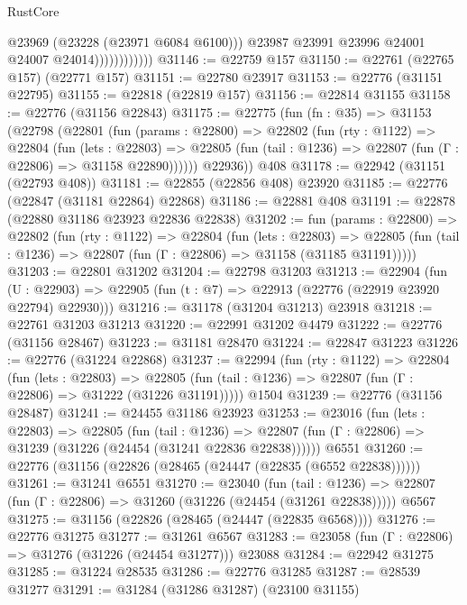 \begin{lexlean}{RustCore}
\begin{coremodule}
                              @23969
                              (@23228 (@23971 @6084 @6100)))
                            @23987
                            @23991
                            @23996
                            @24001
                            @24007
                            @24014))))))))))))
@31146 := @22759 @157
@31150 := @22761 (@22765 @157) (@22771 @157)
@31151 := @22780 @23917
@31153 := @22776 (@31151 @22795)
@31155 := @22818 (@22819 @157)
@31156 := @22814 @31155
@31158 := @22776 (@31156 @22843)
@31175 := @22775
    (fun (fn : @35) =>
    @31153
      (@22798
        (@22801
          (fun (params : @22800) =>
          @22802
            (fun (rty : @1122) =>
            @22804
              (fun (lets : @22803) =>
              @22805 (fun (tail : @1236) => @22807 (fun (Γ : @22806) => @31158 @22890))))))
        @22936))
    @408
@31178 := @22942 (@31151 (@22793 @408))
@31181 := @22855 (@22856 @408) @23920
@31185 := @22776 (@22847 (@31181 @22864) @22868)
@31186 := @22881 @408
@31191 := @22878 (@22880 @31186 @23923 @22836 @22838)
@31202 := fun (params : @22800) =>
  @22802
    (fun (rty : @1122) =>
    @22804
      (fun (lets : @22803) =>
      @22805 (fun (tail : @1236) => @22807 (fun (Γ : @22806) => @31158 (@31185 @31191)))))
@31203 := @22801 @31202
@31204 := @22798 @31203
@31213 := @22904
    (fun (U : @22903) => @22905 (fun (t : @7) => @22913 (@22776 (@22919 @23920 @22794) @22930)))
@31216 := @31178 (@31204 @31213) @23918
@31218 := @22761 @31203 @31213
@31220 := @22991 @31202 @4479
@31222 := @22776 (@31156 @28467)
@31223 := @31181 @28470
@31224 := @22847 @31223
@31226 := @22776 (@31224 @22868)
@31237 := @22994
    (fun (rty : @1122) =>
    @22804
      (fun (lets : @22803) =>
      @22805 (fun (tail : @1236) => @22807 (fun (Γ : @22806) => @31222 (@31226 @31191)))))
    @1504
@31239 := @22776 (@31156 @28487)
@31241 := @24455 @31186 @23923
@31253 := @23016
    (fun (lets : @22803) =>
    @22805
      (fun (tail : @1236) =>
      @22807 (fun (Γ : @22806) => @31239 (@31226 (@24454 (@31241 @22836 @22838))))))
    @6551
@31260 := @22776 (@31156 (@22826 (@28465 (@24447 (@22835 (@6552 @22838))))))
@31261 := @31241 @6551
@31270 := @23040
    (fun (tail : @1236) => @22807 (fun (Γ : @22806) => @31260 (@31226 (@24454 (@31261 @22838)))))
    @6567
@31275 := @31156 (@22826 (@28465 (@24447 (@22835 @6568))))
@31276 := @22776 @31275
@31277 := @31261 @6567
@31283 := @23058 (fun (Γ : @22806) => @31276 (@31226 (@24454 @31277))) @23088
@31284 := @22942 @31275
@31285 := @31224 @28535
@31286 := @22776 @31285
@31287 := @28539 @31277
@31291 := @31284 (@31286 @31287) (@23100 @31155)

\end{coremodule}
\end{lexlean}
